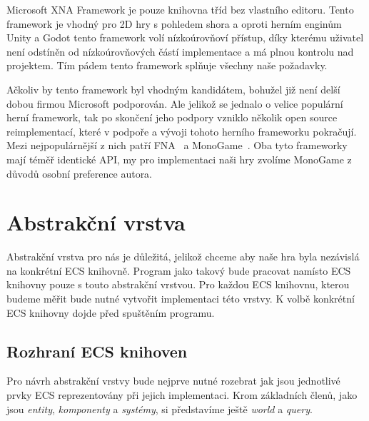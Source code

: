 Microsoft XNA Framework je pouze knihovna tříd bez vlastního editoru. Tento framework je vhodný pro 2D hry s pohledem shora a oproti herním enginům Unity a Godot tento framework volí nízkoúrovňoví přístup, díky kterému uživatel není odstíněn od nízkoúrovňových částí implementace a má plnou kontrolu nad projektem. Tím pádem tento framework splňuje všechny naše požadavky.

Ačkoliv by tento framework byl vhodným kandidátem, bohužel již není delší dobou firmou Microsoft podporován. Ale jelikož se jednalo o velice populární herní framework, tak po skončení jeho podpory vzniklo několik open source reimplementací, které v podpoře a vývoji tohoto herního frameworku pokračují. Mezi nejpopulárnější z nich patří FNA~\cite{FNA} a MonoGame~\cite{MonoGame}. Oba tyto frameworky mají téměř identické API, my pro implementaci naši hry zvolíme MonoGame z důvodů osobní preference autora.

\section{Abstrakční vrstva}
\label{section:abstract-layer-analysis}
Abstrakční vrstva pro nás je důležitá, jelikož chceme aby naše hra byla nezávislá na konkrétní ECS knihovně. Program jako takový bude pracovat namísto ECS knihovny pouze s touto abstrakční vrstvou. Pro každou ECS knihovnu, kterou budeme měřit bude nutné vytvořit implementaci této vrstvy. K volbě konkrétní ECS knihovny dojde před spuštěním programu.

\subsection{Rozhraní ECS knihoven}
Pro návrh abstrakční vrstvy bude nejprve nutné rozebrat jak jsou jednotlivé prvky ECS reprezentovány při jejich implementaci. Krom základních členů, jako jsou \textit{entity}, \textit{komponenty} a \textit{systémy}, si představíme ještě \textit{world} a \textit{query}.

